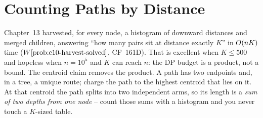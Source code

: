 \section{Counting Paths by Distance}\label{sec:c18-count}

\begin{previouslybox}
Chapter~13 harvested, for every node, a histogram of downward distances and merged
children, answering ``how many pairs sit at distance exactly \(K\)'' in
\(O(nK)\) time (\(\probref{c10-harvest-solved}\), CF~161D). That is excellent
when \(K\le 500\) and hopeless when \(n=10^5\) and \(K\) can reach \(n\): the DP
budget is a product, not a bound. The centroid claim removes the product. A path
has two endpoints and, in a tree, a unique route; charge the path to the highest
centroid that lies on it. At that centroid the path splits into two independent
arms, so its length is a \emph{sum of two depths from one node} -- count those
sums with a histogram and you never touch a \(K\)-sized table.
\end{previouslybox}

